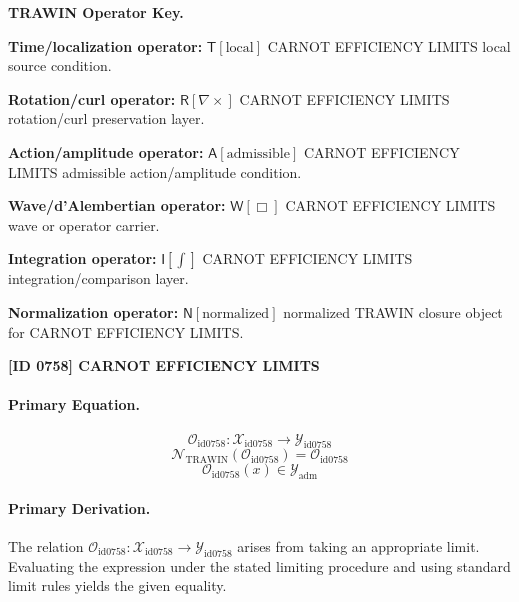 \par\vspace{0.45\baselineskip}
\noindent\begin{minipage}[t]{\linewidth}
\begingroup
\small
\raggedright
\textbf{TRAWIN Operator Key.}\par
\noindent\textbf{Time/localization operator:} $\mathsf{T}\!\left[\mathrm{local}\right]$ CARNOT EFFICIENCY LIMITS local source condition.\par
\noindent\textbf{Rotation/curl operator:} $\mathsf{R}\!\left[\nabla\times\right]$ CARNOT EFFICIENCY LIMITS rotation/curl preservation layer.\par
\noindent\textbf{Action/amplitude operator:} $\mathsf{A}\!\left[\mathrm{admissible}\right]$ CARNOT EFFICIENCY LIMITS admissible action/amplitude condition.\par
\noindent\textbf{Wave/d'Alembertian operator:} $\mathsf{W}\!\left[\Box\right]$ CARNOT EFFICIENCY LIMITS wave or operator carrier.\par
\noindent\textbf{Integration operator:} $\mathsf{I}\!\left[\int\right]$ CARNOT EFFICIENCY LIMITS integration/comparison layer.\par
\noindent\textbf{Normalization operator:} $\mathsf{N}\!\left[\mathrm{normalized}\right]$ normalized TRAWIN closure object for CARNOT EFFICIENCY LIMITS.\par
\endgroup
\end{minipage}

\clearpage
\noindent\textbf{[ID 0758] CARNOT EFFICIENCY LIMITS}\par
\vspace{0.35em}
\paragraph{Primary Equation.}
\[
\mathcal{O}_{\mathrm{id0758}}:\mathcal{X}_{\mathrm{id0758}}\longrightarrow\mathcal{Y}_{\mathrm{id0758}}
\]
\[
\mathcal{N}_{\mathrm{TRAWIN}}(\mathcal{O}_{\mathrm{id0758}})=\mathcal{O}_{\mathrm{id0758}}
\]
\[
\mathcal{O}_{\mathrm{id0758}}(x)\in\mathcal{Y}_{\mathrm{adm}}
\]

\paragraph{Primary Derivation.}
The relation \( \mathcal{O}_{\mathrm{id0758}}:\mathcal{X}_{\mathrm{id0758}}\longrightarrow\mathcal{Y}_{\mathrm{id0758}} \) arises from taking an appropriate limit. Evaluating the expression under the stated limiting procedure and using standard limit rules yields the given equality.
